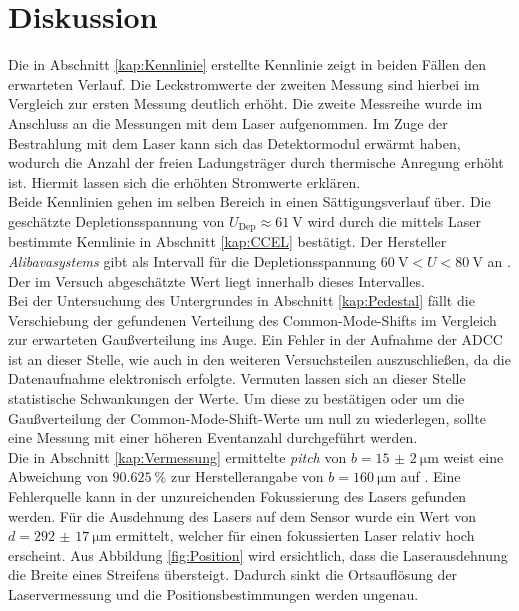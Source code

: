 \section{Diskussion}

Die in Abschnitt \ref{kap:Kennlinie} erstellte Kennlinie zeigt in beiden Fällen den erwarteten Verlauf. Die Leckstromwerte der zweiten Messung sind hierbei im Vergleich zur ersten Messung deutlich erhöht. Die zweite Messreihe wurde im Anschluss an die Messungen mit dem Laser aufgenommen. Im Zuge der Bestrahlung mit dem Laser kann sich das Detektormodul erwärmt haben, wodurch die Anzahl der freien Ladungsträger durch thermische Anregung erhöht ist. Hiermit lassen sich die erhöhten Stromwerte erklären.\\

Beide Kennlinien gehen im selben Bereich in einen Sättigungsverlauf über. Die geschätzte Depletionsspannung von $ U_\mathrm{Dep} \approx \SI{61}{\volt}$ wird durch die mittels Laser bestimmte Kennlinie in Abschnitt \ref{kap:CCEL} bestätigt. Der Hersteller \textit{Alibavasystems} gibt als Intervall für die Depletionsspannung $\SI{60}{\volt} < U < \SI{80}{\volt}$ an \cite{alibava}. Der im Versuch abgeschätzte Wert liegt innerhalb dieses Intervalles.\\

Bei der Untersuchung des Untergrundes in Abschnitt \ref{kap:Pedestal} fällt die Verschiebung der gefundenen Verteilung des Common-Mode-Shifts im Vergleich zur erwarteten Gaußverteilung ins Auge. Ein Fehler in der Aufnahme der ADCC ist an dieser Stelle, wie auch in den weiteren Versuchsteilen auszuschließen, da die Datenaufnahme elektronisch erfolgte. 
Vermuten lassen sich an dieser Stelle statistische Schwankungen der Werte. Um diese zu bestätigen oder um die Gaußverteilung der Common-Mode-Shift-Werte um null zu wiederlegen, sollte eine Messung mit einer höheren Eventanzahl durchgeführt werden.\\

Die in Abschnitt \ref{kap:Vermessung} ermittelte \textit{pitch} von $b = \SI{15(2)}{\micro\metre}$ weist eine Abweichung von $\SI{90.625}{\%}$ zur Herstellerangabe von $b = \SI{160}{\micro\metre}$ auf \cite{alibava}. Eine Fehlerquelle kann in der unzureichenden Fokussierung des Lasers gefunden werden. Für die Ausdehnung des Lasers auf dem Sensor wurde ein Wert von $d = \SI{292(17)}{\micro\metre}$ ermittelt, welcher für einen fokussierten Laser relativ hoch erscheint. Aus Abbildung \ref{fig:Position} wird ersichtlich, dass die Laserausdehnung die Breite eines Streifens übersteigt. Dadurch sinkt die Ortsauflösung der Laservermessung und die Positionsbestimmungen werden ungenau.\\

